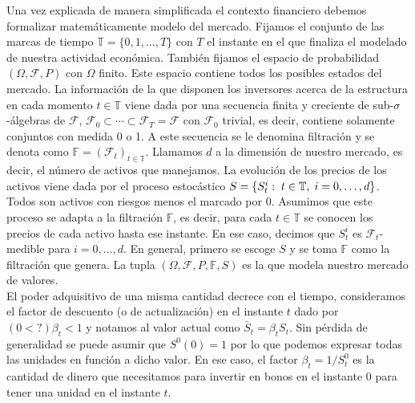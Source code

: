 Una vez explicada de manera simplificada el contexto financiero debemos formalizar matemáticamente modelo del mercado. Fijamos el conjunto de las marcas de tiempo $ \mathbb{T} = \{0,1,\dots,T\}$ con $ T $ el instante en el que finaliza el modelado de nuestra actividad económica. También fijamos el espacio de probabilidad $ (\Omega, \mathcal{F}, P) $ con $ \Omega $ finito. Este espacio contiene todos los posibles estados del mercado. La información de la que disponen los inversores acerca de la estructura en cada momento $ t \in \mathbb{T}$ viene dada por una secuencia finita y creciente de sub-$ \sigma $-álgebras de $ \mathcal{F} $, $ \mathcal{F}_0 \subset \cdots \subset \mathcal{F}_T = \mathcal{F} $ con $ \mathcal{F}_0 $ trivial, es decir, contiene solamente conjuntos con medida 0 o 1. A este secuencia se le denomina filtración y se denota como $ \mathbb{F} = (\mathcal{F}_t)_{t \in \mathbb{T}} $. Llamamos $ d  $ a la dimensión de nuestro mercado, es decir, el número de activos que manejamos. La evolución de los precios de los activos viene dada  por el proceso estocástico $ S = \{S^i_t:\hspace{1mm} t \in \mathbb{T},\hspace{1mm} i=0,\dots,d\} $. Todos son activos con riesgos menos el marcado por $ 0 $. Asumimos que este proceso se adapta a la filtración $ \mathbb{F} $, es decir, para cada $ t \in \mathbb{T} $ se conocen los precios de cada activo hasta ese instante. En ese caso, decimos que $ S_t^i $ es $ \mathcal{F}_t $-medible para $ i=0,\dots,d $. En general, primero se escoge $ S $ y se toma $ \mathbb{F} $ como la filtración que genera. La tupla $ (\Omega, \mathcal{F}, P, \mathbb{F}, S) $ es la que modela nuestro mercado de valores. \\

El poder adquisitivo de una misma cantidad decrece con el tiempo, consideramos el factor de descuento (o de actualización) en el instante $ t $ dado por $ (0 <?) \beta_t < 1 $ y notamos al valor actual como $ \bar{S}_t = \beta_t S_t $. Sin pérdida de generalidad se puede asumir que $ S^0(0) = 1 $ por lo que podemos expresar todas las unidades en función a dicho valor. En ese caso, el factor $ \beta_t = 1/S^0_t $ es la cantidad de dinero que necesitamos para invertir en bonos en el instante 0 para tener una unidad en el instante $ t $. \\

